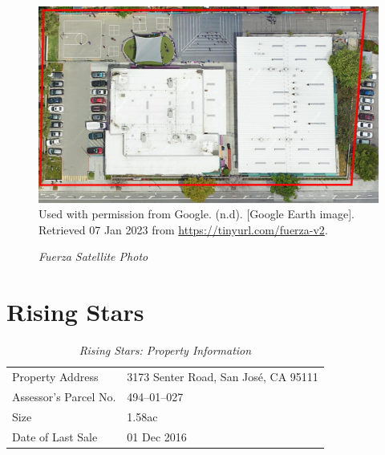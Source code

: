 \begin{figure}[hbtp]
  \caption[Fuerza Satellite Photo]{\textit{Fuerza Satellite Photo}}
  \label{fig:fuerza-sat-photo}
  \includegraphics[width=\textwidth]{Satellite-Photos/fuerza-sat-photo}\\ %
  {Used with permission from Google. (n.d). [Google Earth image]. Retrieved 07 Jan 2023 from \url{https://tinyurl.com/fuerza-v2}}.
\end{figure}


\clearpage
\section{Rising Stars}\label{sec:rising-stars-info}\indent

\begin{table}[htbp]
  \SingleSpacing%
  \caption[Rising Stars: Property Information]{\textit{Rising Stars: Property Information}}%
  \label{tab:rising-stars-prop-info}
  \begin{tabular}{ll}
    \toprule
    Property Address      & 3173 Senter Road, San José, CA 95111 \\
    Assessor's Parcel No. & 494–01–027 \\
    Size                  & 1.58ac \\
    Date of Last Sale     & 01 Dec 2016 \\
    \bottomrule
  \end{tabular}
\end{table}

